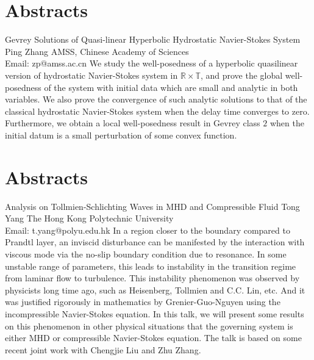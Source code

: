 \documentclass[
	openany, %
	parskip=full, %
	12pt, %
	a4paper, %
]{conferencebooklet} %
\begin{document}
\chapter*{Abstracts}
\abstract
    {Gevrey Solutions of Quasi-linear Hyperbolic Hydrostatic Navier-Stokes System}
    {Ping Zhang}
    {}
    {AMSS, Chinese Academy of Sciences\\
    Email: zp@amss.ac.cn}
    {We study the well-posedness of  a hyperbolic quasilinear version of hydrostatic  Navier-Stokes system in $\mathbb{R}\times \mathbb{T}$, and  prove the global well-posedness of the system with initial  data which are small and analytic  in both variables. We also prove  the convergence of such analytic solutions to that of the classical hydrostatic Navier-Stokes system when the delay time converges to zero. Furthermore, we obtain a local well-posedness result in Gevrey class $2$ when the initial datum is a small perturbation of some convex function.}


\chapter*{Abstracts}
\abstract
    {Analysis on Tollmien-Schlichting Waves in MHD and Compressible Fluid}
    {Tong Yang}
    {}
    {The Hong Kong Polytechnic University\\
    Email: t.yang@polyu.edu.hk}
    {In a region closer to the boundary compared to Prandtl layer, an inviscid disturbance can be manifested by the interaction with viscous mode via the no-slip boundary condition due to resonance. In some unstable range of parameters, this leads to instability in the transition regime from laminar flow to turbulence. This instability phenomenon was observed by physicists long time ago, such as Heisenberg, Tollmien and  C.C. Lin, etc.  And it was justified rigorously in mathematics by Grenier-Guo-Nguyen using the incompressible Navier-Stokes equation. In this talk, we will present some results on this phenomenon in other physical situations that the governing system is either MHD or compressible Navier-Stokes equation.  The talk is based on some recent joint work with Chengjie Liu and Zhu Zhang.}
\end{document}
